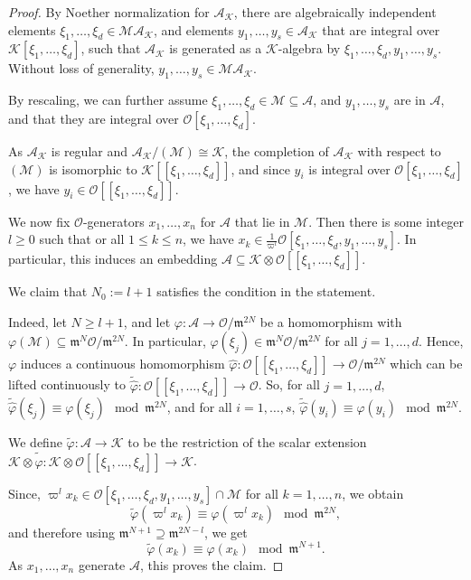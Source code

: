 \documentclass[10pt,a4paper]{amsart}
\theoremstyle{plain} %
\theoremstyle{definition}
\theoremstyle{remark}
\newcommand{\cA}{\mathcal{A}}
\newcommand{\cM}{\mathcal{M}}
\newcommand{\cK}{\mathcal{K}}   %
\newcommand{\cO}{\mathcal{O}}   %
\newcommand{\fm}{\mathfrak{m}}  %
\newcommand{\ps}[1]{[\![#1]\!]}  %
\numberwithin{equation}{subsection}
\begin{document}
\begin{proof}
By Noether normalization for $\cA_\cK$, there are algebraically independent elements $\xi_1,\ldots, \xi_d\in \cM\cA_\cK$, and elements $y_1,\ldots, y_s\in \cA_\cK$ that are integral over $\cK[\xi_1,\ldots, \xi_d]$, such that
$\cA_\cK$ is generated as a $\cK$-algebra by $\xi_1,\ldots, \xi_d,y_1,\ldots, y_s$.
Without loss of generality, $y_1,\ldots,y_s\in \cM\cA_\cK$.

By rescaling, we can further assume $\xi_1,\ldots, \xi_d\in \cM\subseteq \cA$, and $y_1,\ldots,y_s$ are in $\cA$, and that they are integral over $\cO[\xi_1,\ldots, \xi_d]$.

As $\cA_\cK$ is regular and $\cA_\cK/(\cM) \cong \cK$, the completion of $\cA_\cK$ with respect to $(\cM)$ is isomorphic to $\cK\ps{\xi_1,\ldots, \xi_d}$, and since $y_i$ is integral over $\cO[\xi_1,\ldots,\xi_d]$, we have $y_i\in \cO\ps{\xi_1,\ldots, \xi_d}$.

We now fix $\cO$-generators $x_1,\ldots, x_n$ for $\cA$ that lie in $\cM$. Then there is some integer $l\geq 0$ such that or all $1\leq k\leq n$, we have $x_k\in \frac{1}{\varpi^l} \cO[\xi_1,\ldots, \xi_d,y_1,\ldots, y_s]$. In particular, this induces an embedding $\cA\subseteq \cK\otimes \cO\ps{\xi_1,\ldots,\xi_d}$.

We claim that $N_0:=l+1$ satisfies the condition in the statement.

Indeed, let $N\geq l+1$, and let $\varphi: \cA\to \cO/\fm^{2N}$ be a homomorphism with $\varphi(\cM)\subseteq \fm^N\cO/\fm^{2N}$.
In particular, $\varphi(\xi_j)\in \fm^N\cO/\fm^{2N}$ for all $j=1,\ldots, d$. Hence, $\varphi$ induces a continuous homomorphism $\hat{\varphi}:\cO\ps{\xi_1,\ldots, \xi_d}\to \cO/\fm^{2N}$ which can be lifted continuously to
$\tilde{\hat{\varphi}}:\cO\ps{\xi_1,\ldots, \xi_d}\to \cO$.
So, for all $j=1,\ldots, d$, $\tilde{\hat{\varphi}}(\xi_j)\equiv \varphi(\xi_j) \mod{\fm^{2N}}$, and for all $i=1,\ldots, s$, 
$\tilde{\hat{\varphi}}(y_i)\equiv \varphi(y_i) \mod{\fm^{2N}}$.

We define $\tilde{\varphi}:\cA\to \cK$ to be the restriction of the scalar extension $\cK\otimes \tilde{\hat{\varphi}}:\cK\otimes \cO\ps{\xi_1,\ldots,\xi_d}\to \cK$.

Since, $\varpi^l x_k\in \cO[\xi_1,\ldots, \xi_d,y_1,\ldots, y_s]\cap \cM$ for all $k=1,\ldots,n$, we obtain
\[\tilde{\varphi}(\varpi^l x_k)\equiv \varphi(\varpi^l x_k) \mod \fm^{2N},
\]
and therefore using $\fm^{N+1}\supseteq \fm^{2N-l}$, we get
\[ \tilde{\varphi}(x_k)\equiv \varphi(x_k) \mod \fm^{N+1}.
\]
As $x_1,\ldots, x_n$ generate $\cA$, this proves the claim.
\end{proof}
\end{document}

